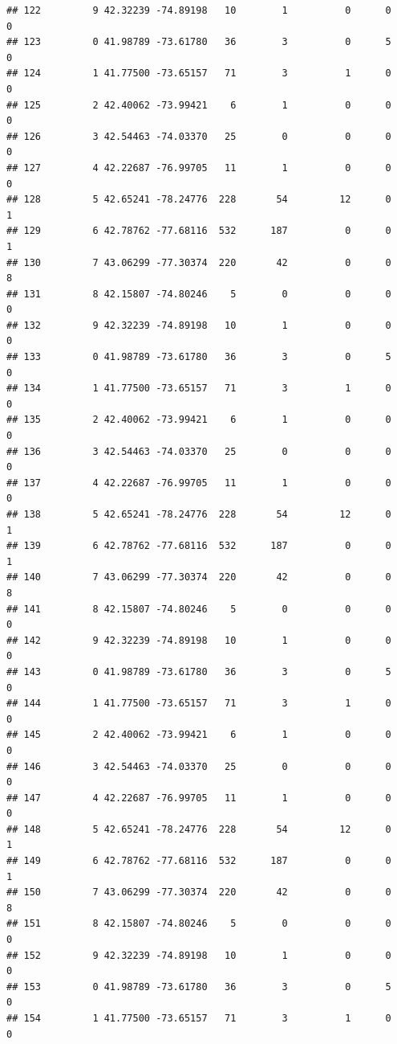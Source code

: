 \documentclass[
]{article}
\begin{document}
\begin{verbatim}
## 122         9 42.32239 -74.89198   10        1          0      0            0
## 123         0 41.98789 -73.61780   36        3          0      5            0
## 124         1 41.77500 -73.65157   71        3          1      0            0
## 125         2 42.40062 -73.99421    6        1          0      0            0
## 126         3 42.54463 -74.03370   25        0          0      0            0
## 127         4 42.22687 -76.99705   11        1          0      0            0
## 128         5 42.65241 -78.24776  228       54         12      0            1
## 129         6 42.78762 -77.68116  532      187          0      0            1
## 130         7 43.06299 -77.30374  220       42          0      0            8
## 131         8 42.15807 -74.80246    5        0          0      0            0
## 132         9 42.32239 -74.89198   10        1          0      0            0
## 133         0 41.98789 -73.61780   36        3          0      5            0
## 134         1 41.77500 -73.65157   71        3          1      0            0
## 135         2 42.40062 -73.99421    6        1          0      0            0
## 136         3 42.54463 -74.03370   25        0          0      0            0
## 137         4 42.22687 -76.99705   11        1          0      0            0
## 138         5 42.65241 -78.24776  228       54         12      0            1
## 139         6 42.78762 -77.68116  532      187          0      0            1
## 140         7 43.06299 -77.30374  220       42          0      0            8
## 141         8 42.15807 -74.80246    5        0          0      0            0
## 142         9 42.32239 -74.89198   10        1          0      0            0
## 143         0 41.98789 -73.61780   36        3          0      5            0
## 144         1 41.77500 -73.65157   71        3          1      0            0
## 145         2 42.40062 -73.99421    6        1          0      0            0
## 146         3 42.54463 -74.03370   25        0          0      0            0
## 147         4 42.22687 -76.99705   11        1          0      0            0
## 148         5 42.65241 -78.24776  228       54         12      0            1
## 149         6 42.78762 -77.68116  532      187          0      0            1
## 150         7 43.06299 -77.30374  220       42          0      0            8
## 151         8 42.15807 -74.80246    5        0          0      0            0
## 152         9 42.32239 -74.89198   10        1          0      0            0
## 153         0 41.98789 -73.61780   36        3          0      5            0
## 154         1 41.77500 -73.65157   71        3          1      0            0

\end{verbatim}
\end{document}
